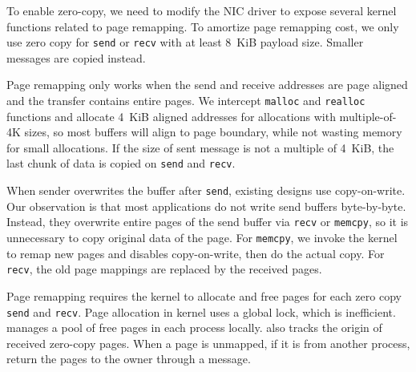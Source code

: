 
To enable zero-copy, we need to modify the NIC driver to expose several kernel functions related to page remapping. 
To amortize page remapping cost, we only use zero copy for \texttt{send} or \texttt{recv} with at least 8~KiB payload size.
Smaller messages are copied instead.

Page remapping only works when the send and receive addresses are page aligned and the transfer contains entire pages.
We intercept \texttt{malloc} and \texttt{realloc} functions and allocate 4~KiB aligned addresses for allocations with multiple-of-4K sizes, so most buffers will align to page boundary, while not wasting memory for small allocations.
If the size of sent message is not a multiple of 4~KiB, the last chunk of data is copied on \texttt{send} and \texttt{recv}.



When sender overwrites the buffer after \texttt{send}, existing designs use copy-on-write. %
Our observation is that most applications do not write send buffers byte-by-byte. Instead, they overwrite entire pages of the send buffer via \texttt{recv} or \texttt{memcpy}, so it is unnecessary to copy original data of the page.
For \texttt{memcpy}, we invoke the kernel to remap new pages and disables copy-on-write, then do the actual copy.
For \texttt{recv}, the old page mappings are replaced by the received pages.


Page remapping requires the kernel to allocate and free pages for each zero copy \texttt{send} and \texttt{recv}. 
Page allocation in kernel uses a global lock, which is inefficient. \libipc{} manages a pool of free pages in each process locally.
\libipc{} also tracks the origin of received zero-copy pages.
When a page is unmapped, if it is from another process, \libipc{} return the pages to the owner through a message.

